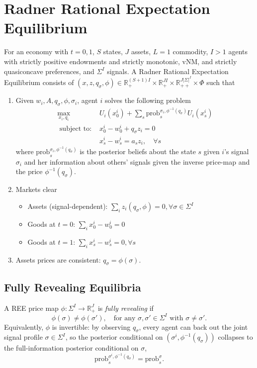 \section{Radner Rational Expectation Equilibrium}
For an economy with $t = 0, 1$, $S$ states, $J$ assets, $L=1$ commodity, 
$I > 1$ agents with strictly positive endowments and 
strictly monotonic, vNM, and strictly quasiconcave preferences, and
$\Sigma^I$ signals.
A Radner Rational Expectation Equilibrium consists of 
$(x, z, q_\sigma, \phi) \in 
\mathbb{R}_{+}^{(S+1)I} \times \mathbb{R}_{+}^{JI} \times 
\mathbb{R}_{++}^{J |\Sigma|^I} \times \Phi$ 
such that 
\begin{enumerate}
    \item Given $w_i, A, q_\sigma, \phi, \sigma_i$, agent $i$ solves the following problem 
        \begin{align*}
            \max_{x_i, q_i} \ & U_i(x^i_0) + \sum_s \text{prob}_s^{\sigma_i, \phi^{-1}(q_\sigma)} U_i(x^i_s) \\ 
            \text{ subject to: }  & x^i_0 - w^i_0 + q_\sigma z_i = 0 \\ 
            &  x^i_s - w^i_s = a_s z_i, \quad \forall s 
        \end{align*}
    where $\text{prob}_s^{\sigma_i, \phi^{-1}(q_\sigma)}$ is the posterior beliefs about the state $s$ given 
    $i$'s signal $\sigma_i$ and her information about others' signals given the inverse price-map and the price $\phi^{-1}(q_\sigma)$.
    \item Markets clear 
        \begin{itemize}
            \item Assets (signal-dependent): $\sum_i z_i(q_\sigma, \phi) = 0, \forall \sigma \in \Sigma^I$
            \item Goods at $t = 0$: $\sum_i x^i_0 - w^i_0 = 0$
            \item Goods at $t = 1$: $\sum_i x^i_s - w^i_s = 0, \forall s$
        \end{itemize}
    \item Assets prices are consistent: $q_\sigma = \phi(\sigma)$.
\end{enumerate}

\subsection{Fully Revealing Equilibria}

\begin{definition}
A REE price map $\phi: \Sigma^I \to \mathbb{R}^J_+$ is \emph{fully revealing} if
\[
\phi(\sigma) \neq \phi(\sigma'), \quad \text{for any } \sigma, \sigma' \in \Sigma^I \text{ with } \sigma \neq \sigma'.
\]
Equivalently, $\phi$ is invertible: by observing $q_\sigma$, every agent can back out the joint signal profile $\sigma \in \Sigma^I$, so the posterior conditional on $(\sigma^i, \phi^{-1}(q_\sigma))$ collapses to the full-information posterior conditional on $\sigma$,
\[
\text{prob}^{\sigma^i, \phi^{-1}(q_\sigma)}_s = \text{prob}^{\sigma}_s.
\]
\end{definition}

